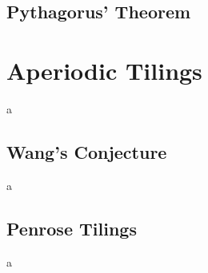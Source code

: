 \documentclass[a4paper,12pt,twoside,abstraction,titlepage]{article}
\theoremstyle{remark}
\theoremstyle{definition}
\begin{document}
\subsection{Pythagorus' Theorem}

\newpage
\section{Aperiodic Tilings}
a
\newpage
\subsection{Wang's Conjecture}
a
\newpage
\subsection{Penrose Tilings}
a
\end{document}
